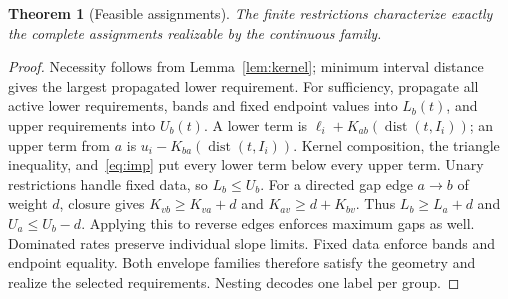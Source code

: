\documentclass[10pt,letterpaper]{article}
\newtheorem{theorem}[proposition]{Theorem}
\newcommand{\dist}{\operatorname{dist}}
\begin{document}
\begin{samepage}
\begin{theorem}[Feasible assignments]\label{thm:feas}
The finite restrictions characterize exactly the complete assignments realizable by the continuous family.
\end{theorem}
\end{samepage}
\begin{proof}
Necessity follows from Lemma~\ref{lem:kernel}; minimum interval distance gives the largest propagated lower requirement. For sufficiency, propagate all active lower requirements, bands and fixed endpoint values into $L_b(t)$, and upper requirements into $U_b(t)$. A lower term is $\ell_i+K_{ab}(\dist(t,I_i))$; an upper term from $a$ is $u_i-K_{ba}(\dist(t,I_i))$. Kernel composition, the triangle inequality, and~\eqref{eq:imp} put every lower term below every upper term. Unary restrictions handle fixed data, so $L_b\le U_b$.
For a directed gap edge $a\to b$ of weight $d$, closure gives $K_{vb}\ge K_{va}+d$ and $K_{av}\ge d+K_{bv}$. Thus $L_b\ge L_a+d$ and $U_a\le U_b-d$. Applying this to reverse edges enforces maximum gaps as well. Dominated rates preserve individual slope limits. Fixed data enforce bands and endpoint equality. Both envelope families therefore satisfy the geometry and realize the selected requirements. Nesting decodes one label per group.
\end{proof}
\end{document}
